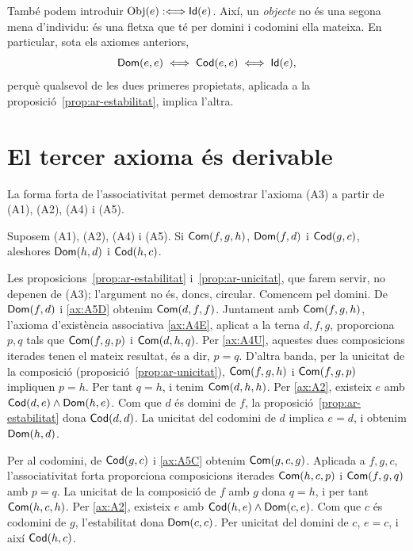 També podem introduir $\operatorname{Obj}(e):\Longleftrightarrow\mathsf{Id}(e)$. Així, un \emph{objecte} no és una segona mena d'individu: és una fletxa que té per domini i codomini ella mateixa. En particular, sota els axiomes anteriors,
\[
\mathsf{Dom}(e,e)
\;\Longleftrightarrow\;
\mathsf{Cod}(e,e)
\;\Longleftrightarrow\;
\mathsf{Id}(e),
\]
perquè qualsevol de les dues primeres propietats, aplicada a la proposició~\ref{prop:ar-estabilitat}, implica l'altra.

\section{El tercer axioma és derivable}
\label{sec:ar-redundancia}

La forma forta de l'associativitat permet demostrar l'axioma (A3) a partir de (A1), (A2), (A4) i (A5).

\begin{proposicio}[redundància de (A3)]
\label{prop:ar-redundancia}
Suposem (A1), (A2), (A4) i (A5). Si $\mathsf{Com}(f,g,h)$, $\mathsf{Dom}(f,d)$ i $\mathsf{Cod}(g,c)$, aleshores $\mathsf{Dom}(h,d)$ i $\mathsf{Cod}(h,c)$.
\end{proposicio}

\begin{prova}
Les proposicions~\ref{prop:ar-estabilitat} i~\ref{prop:ar-unicitat}, que farem servir, no depenen de (A3); l'argument no és, doncs, circular. Comencem pel domini. De $\mathsf{Dom}(f,d)$ i \eqref{ax:A5D} obtenim $\mathsf{Com}(d,f,f)$. Juntament amb $\mathsf{Com}(f,g,h)$, l'axioma d'existència associativa \eqref{ax:A4E}, aplicat a la terna $d,f,g$, proporciona $p,q$ tals que $\mathsf{Com}(f,g,p)$ i $\mathsf{Com}(d,h,q)$. Per \eqref{ax:A4U}, aquestes dues composicions iterades tenen el mateix resultat, és a dir, $p=q$. D'altra banda, per la unicitat de la composició (proposició~\ref{prop:ar-unicitat}), $\mathsf{Com}(f,g,h)$ i $\mathsf{Com}(f,g,p)$ impliquen $p=h$. Per tant $q=h$, i tenim $\mathsf{Com}(d,h,h)$. Per \eqref{ax:A2}, existeix $e$ amb $\mathsf{Cod}(d,e)\land\mathsf{Dom}(h,e)$. Com que $d$ és domini de $f$, la proposició~\ref{prop:ar-estabilitat} dona $\mathsf{Cod}(d,d)$. La unicitat del codomini de $d$ implica $e=d$, i obtenim $\mathsf{Dom}(h,d)$.

Per al codomini, de $\mathsf{Cod}(g,c)$ i \eqref{ax:A5C} obtenim $\mathsf{Com}(g,c,g)$. Aplicada a $f,g,c$, l'associativitat forta proporciona composicions iterades $\mathsf{Com}(h,c,p)$ i $\mathsf{Com}(f,g,q)$ amb $p=q$. La unicitat de la composició de $f$ amb $g$ dona $q=h$, i per tant $\mathsf{Com}(h,c,h)$. Per \eqref{ax:A2}, existeix $e$ amb $\mathsf{Cod}(h,e)\land\mathsf{Dom}(c,e)$. Com que $c$ és codomini de $g$, l'estabilitat dona $\mathsf{Dom}(c,c)$. Per unicitat del domini de $c$, $e=c$, i així $\mathsf{Cod}(h,c)$.
\end{prova}

